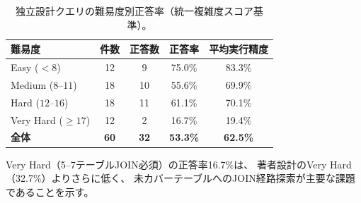\documentclass[5p,twocolumn]{elsarticle}
\begin{document}
\begin{table}[htbp]
  \centering
  \caption{独立設計クエリの難易度別正答率（統一複雑度スコア基準）。}
  \label{tab:sup_expert_category}
  \small
  \begin{tabular}{lcccc}
    \toprule
    難易度 & 件数 & 正答数 & 正答率 & 平均実行精度 \\
    \midrule
    Easy ($< 8$) & 12 & 9 & 75.0\% & 83.3\% \\
    Medium ($8$--$11$) & 18 & 10 & 55.6\% & 69.9\% \\
    Hard ($12$--$16$) & 18 & 11 & 61.1\% & 70.1\% \\
    Very Hard ($\geq 17$) & 12 & 2 & 16.7\% & 19.4\% \\
    \midrule
    \textbf{全体} & \textbf{60} & \textbf{32} & \textbf{53.3\%} & \textbf{62.5\%} \\
    \bottomrule
  \end{tabular}
\end{table}

Very Hard（5--7テーブルJOIN必須）の正答率16.7\%は、
著者設計のVery Hard（32.7\%）よりさらに低く、
未カバーテーブルへのJOIN経路探索が主要な課題であることを示す。
\end{document}
